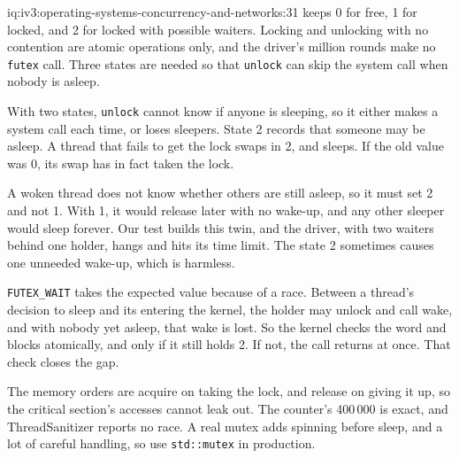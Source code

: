 \begin{solution}{iq:iv3:operating-systems-concurrency-and-networks:31}
 keeps 0 for free, 1 for locked, and 2 for locked with possible waiters. Locking and unlocking with no contention are atomic operations only, and the driver's million rounds make no \texttt{futex} call. Three states are needed so that \texttt{unlock} can skip the system call when nobody is asleep.
\label{lst:iv3:os:futex}

With two states, \texttt{unlock} cannot know if anyone is sleeping, so it either makes a system call each time, or loses sleepers. State 2 records that someone may be asleep. A thread that fails to get the lock swaps in 2, and sleeps. If the old value was 0, its swap has in fact taken the lock.

A woken thread does not know whether others are still asleep, so it must set 2 and not 1. With 1, it would release later with no wake-up, and any other sleeper would sleep forever. Our test builds this twin, and the driver, with two waiters behind one holder, hangs and hits its time limit. The state 2 sometimes causes one unneeded wake-up, which is harmless.

\texttt{FUTEX\_WAIT} takes the expected value because of a race. Between a thread's decision to sleep and its entering the kernel, the holder may unlock and call wake, and with nobody yet asleep, that wake is lost. So the kernel checks the word and blocks atomically, and only if it still holds 2. If not, the call returns at once. That check closes the gap.

The memory orders are acquire on taking the lock, and release on giving it up, so the critical section's accesses cannot leak out. The counter's 400\,000 is exact, and ThreadSanitizer reports no race. A real mutex adds spinning before sleep, and a lot of careful handling, so use \texttt{std::mutex} in production.

\end{solution}

